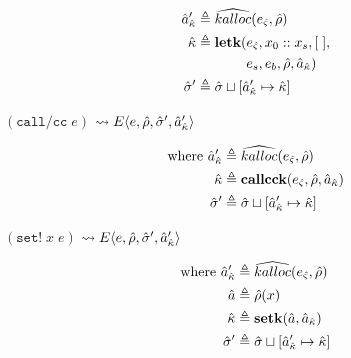 \documentclass[12pt,draft]{article}
\newcommand{\callccsyn}[1]{(\texttt{call/cc}\;#1)}
\newcommand{\setsyn}[2]{(\texttt{set!}\;#1\;#2)}
\newcommand{\E}[4]{E\langle #1 , #2 , #3 , #4 \rangle}
\begin{document}
{\begin{multicols*}{2}
\begin{align*}
  \hat{a}_{\hat{\kappa}}' &\triangleq \widehat{kalloc}(e_{\hat{\varsigma}} , \hat{\rho}) \\
  \hat{\kappa} &\triangleq \textbf{letk}(e_{\hat{\varsigma}}, x_0::x_s , [\;], \\
  &\;\;\;\;\;\;\;\;\;\;\;\;\;e_s, e_b , \hat{\rho} , \hat{a}_{\hat{\kappa}}) \\
  \hat{\sigma}' &\triangleq \hat{\sigma} \sqcup [\hat{a}_{\hat{\kappa}}' \mapsto \hat{\kappa}]
\end{align*}
\begin{center}
  $\callccsyn{e}$
  $\leadsto \E{e}{\aenv}{\astore'}{\akaddr'}$
\end{center}
\vspace{-7mm}
\begin{align*}
  \text{where }
  \hat{a}_{\hat{\kappa}}' &\triangleq \widehat{kalloc}(e_{\hat{\varsigma}} , \hat{\rho}) \\
  \hat{\kappa} &\triangleq \textbf{callcck}(e_{\hat{\varsigma}} , \hat{\rho} , \hat{a}_{\hat{\kappa}}) \\
  \hat{\sigma}' &\triangleq \hat{\sigma} \sqcup [\hat{a}_{\hat{\kappa}}' \mapsto \hat{\kappa}]
\end{align*}
\begin{center}
  $\setsyn{x}{e}$
  $\leadsto \E{e}{\aenv}{\astore'}{\akaddr'}$
\end{center}
\vspace{-7mm}
\begin{align*}
  \text{where }
  \hat{a}_{\hat{\kappa}}' &\triangleq \widehat{kalloc}(e_{\hat{\varsigma}} , \hat{\rho}) \\
  \hat{a} &\triangleq \hat{\rho}(x) \\
  \hat{\kappa} &\triangleq \textbf{setk}(\hat{a} , \hat{a}_{\hat{\kappa}}) \\
  \hat{\sigma}' &\triangleq \hat{\sigma} \sqcup [\hat{a}_{\hat{\kappa}}' \mapsto \hat{\kappa}]
\end{align*}


\vfill\null
\columnbreak


\end{multicols*}}
\end{document}
